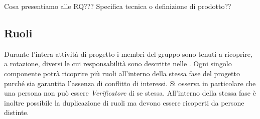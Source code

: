 Cosa presentiamo alle RQ??? Specifica tecnica o definizione di prodotto??

\subsection{Ruoli}
Durante l'intera attività di progetto i membri del gruppo \GroupName{} sono tenuti a ricoprire, a rotazione, diversi  le cui responsabilità sono descritte nelle \NormeDiProgetto{}. Ogni singolo componente potrà ricoprire più ruoli all'interno della stessa fase del progetto purché sia garantita l'assenza di conflitto di interessi. Si osserva in particolare che una persona non può essere \textit{Verificatore} di se stessa. All'interno della stessa fase è inoltre possibile la duplicazione di ruoli ma devono essere ricoperti da persone distinte. 


